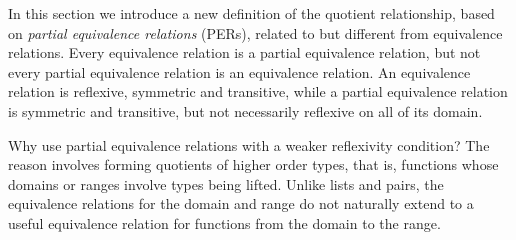 \documentclass[envcountsame,runningheads]{llncs}
\newcommand{\quotient}{partial equivalence}
\begin{document}
In this section we introduce a new definition of the quotient
relationship, based on {\it \quotient{} relations}
(PERs), related to but different from equivalence relations.
Every equivalence relation is a \quotient{} relation, but
not every \quotient{} relation is an equivalence relation.
An equivalence relation is reflexive, symmetric and transitive,
while a \quotient{} relation is symmetric and transitive, but not
necessarily reflexive on all of its domain. 

Why use \quotient{} relations with a weaker reflexivity condition?
The reason involves forming quotients of higher order types, that is,
functions whose domains or ranges involve types being lifted.  Unlike lists
and pairs, the equivalence relations for the domain and range do not
naturally extend to a useful equivalence relation for functions
from the domain to the range.  
\end{document}
